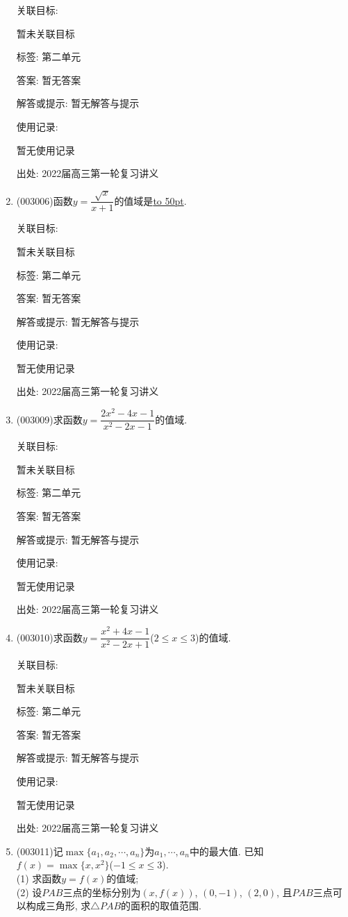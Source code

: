 \documentclass[10pt,a4paper]{article}
\newcommand{\blank}[1]{\underline{\hbox to #1pt{}}}
\begin{document}
\begin{enumerate}[1.]
关联目标:

暂未关联目标



标签: 第二单元

答案: 暂无答案

解答或提示: 暂无解答与提示

使用记录:

暂无使用记录


出处: 2022届高三第一轮复习讲义
\item { (003006)}函数$y=\dfrac{\sqrt x}{x+1}$的值域是\blank{50}.


关联目标:

暂未关联目标



标签: 第二单元

答案: 暂无答案

解答或提示: 暂无解答与提示

使用记录:

暂无使用记录


出处: 2022届高三第一轮复习讲义
\item { (003009)}求函数$y=\dfrac{2x^2-4x-1}{x^2-2x-1}$的值域.


关联目标:

暂未关联目标



标签: 第二单元

答案: 暂无答案

解答或提示: 暂无解答与提示

使用记录:

暂无使用记录


出处: 2022届高三第一轮复习讲义
\item { (003010)}求函数$y=\dfrac{x^2+4x-1}{x^2-2x+1}$($2\le x\le 3$)的值域.


关联目标:

暂未关联目标



标签: 第二单元

答案: 暂无答案

解答或提示: 暂无解答与提示

使用记录:

暂无使用记录


出处: 2022届高三第一轮复习讲义
\item { (003011)}记$\max\{a_1,a_2,\cdots,a_n\}$为$a_1,\cdots,a_n$中的最大值. 已知$f(x)=\max\{x,x^2\}$($-1\le x\le 3$).\\
(1) 求函数$y=f(x)$的值域;\\
(2) 设$PAB$三点的坐标分别为$(x,f(x))$, $(0,-1)$, $(2,0)$, 且$PAB$三点可以构成三角形, 求$\triangle PAB$的面积的取值范围.



\end{enumerate}
\end{document}
